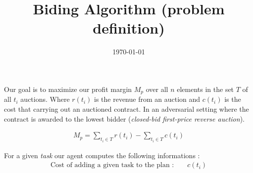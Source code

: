 \documentclass[11pt]{article}
\title{Biding Algorithm (problem definition)}
\date{\today}
\begin{document}
\maketitle	

Our goal is to maximize our profit margin $M_p$ over all $n$ elements in the set $T$ of all $t_i$ auctions. Where $r(t_i)$ is the revenue from an auction and $c(t_i)$ is the cost that carrying out an auctioned contract. In an adversarial setting where the contract is awarded to the lowest bidder (\textit{closed-bid first-price reverse auction}).

\begin{align}
    M_p = \sum_{t_i \in T} r(t_i) - \sum_{t_i \in T} c(t_i)
\end{align}

For a given \textit{task} our agent computes the following informations : 
\begin{align*}
    \text{Cost of adding a given task to the plan : } && c(t_i) \\
\end{align*}
\end{document}
